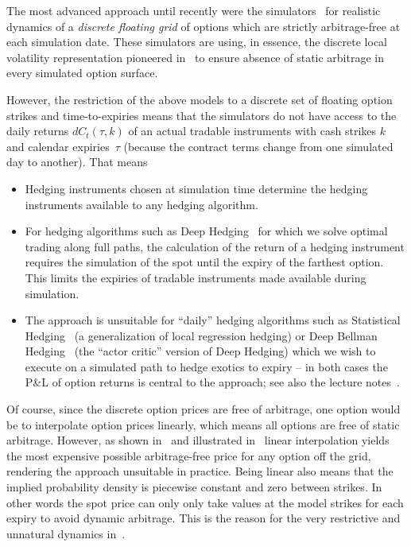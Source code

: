 \documentclass[11pt,a4paper]{article}
\begin{document}
The most advanced approach until recently were the simulators~\cite{wiese2019simulate,wiese2021multiassetspotoptionmarket,Cohen02012023} 
for realistic dynamics of
a \emph{discrete floating grid} of options which are strictly
 arbitrage-free at each simulation date. These simulators are using, in essence, the discrete local volatility
representation pioneered in~\cite{DLV} to ensure absence of static arbitrage in every simulated
option surface. 


However, the restriction of the above models to a discrete set of floating option strikes and time-to-expiries
means that the simulators do not have access to the daily returns $dC_t(\tau,k)$
of an actual tradable instruments with cash strikes $k$ and calendar expiries~$\tau$ (because the
contract terms change from one simulated day to another). 
That means 
\begin{itemize}
    \item Hedging instruments chosen at simulation time determine the hedging instruments available
          to any hedging algorithm.
    \item For hedging algorithms such as Deep Hedging~\cite{DH} for which we solve optimal
          trading along full paths, the calculation of the return of a hedging instrument requires the simulation of
          the spot until the expiry of the farthest option. This limits the 
          expiries of tradable instruments made available during simulation.
    \item The approach is unsuitable for ``daily'' hedging algorithms such as Statistical
            Hedging~\cite{SH}
            (a generalization of local regression hedging)
          or Deep Bellman Hedging~\cite{DBH}  (the ``actor critic'' version of Deep Hedging) which we wish to execute on a simulated
          path to hedge
          exotics to expiry
          -- in both cases the P\&L of option
          returns is central to the approach; see also the lecture
          notes~\cite{SHlecture}.
\end{itemize}
Of course, since the discrete option prices are free of arbitrage, one option would be 
to interpolate option prices linearly, which means all options are free of static arbitrage.
However, as shown in~\cite{buehler2006expensive} and illustrated in~\cite{SANOS2026}
linear interpolation yields the most expensive possible arbitrage-free price for any
option off the grid, rendering the approach unsuitable in practice. Being linear
also means that the implied probability density is piecewise constant and zero between strikes.
In other words
the spot price can only only take values at the model strikes for each expiry to avoid dynamic
arbitrage.
This is the reason
for the very restrictive and unnatural dynamics in~\cite{Schweizer2008ArbitragefreeMM}.
\end{document}
